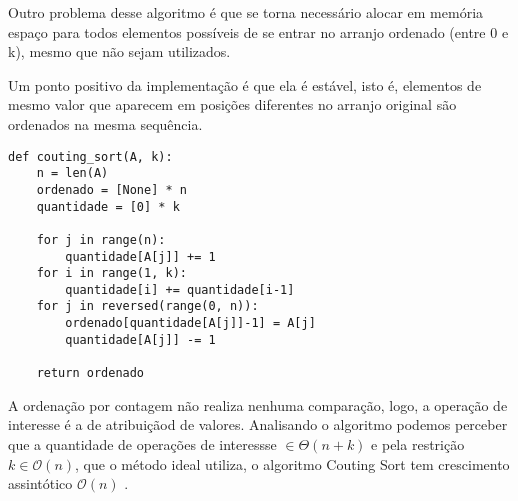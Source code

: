 \documentclass[a4paper, twocolumn]{article}
\theoremstyle{definition}
\begin{document}
Outro problema desse algoritmo é que se torna necessário alocar em memória espaço para todos elementos possíveis de se entrar no arranjo ordenado (entre 0 e k), mesmo que não sejam utilizados.

Um ponto positivo da implementação é que ela é estável, isto é, elementos de mesmo valor que aparecem em posições diferentes no arranjo original são ordenados na mesma sequência.

\begin{lstlisting}[label=Couting Sort,caption= Couting Sort]
def couting_sort(A, k):
    n = len(A)
    ordenado = [None] * n
    quantidade = [0] * k

    for j in range(n): 
        quantidade[A[j]] += 1
    for i in range(1, k): 
        quantidade[i] += quantidade[i-1]
    for j in reversed(range(0, n)):
        ordenado[quantidade[A[j]]-1] = A[j]
        quantidade[A[j]] -= 1

    return ordenado
\end{lstlisting}

A ordenação por contagem não realiza nenhuma comparação, logo, a operação de interesse é a de atribuiçãod de valores. Analisando o algoritmo podemos perceber que a quantidade de operações de interessse $\in \Theta(n+k)$ e pela restrição $k \in \mathcal{O}(n)$, que o método ideal utiliza, o algoritmo Couting Sort tem crescimento assintótico $\mathcal{O}(n)$ .
\end{document}
